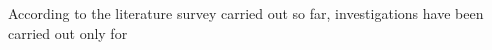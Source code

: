 \documentclass{article}
\begin{document}
According to the literature survey carried out so far, investigations have been carried out only for 

   



 






 



%
%
\end{document}
